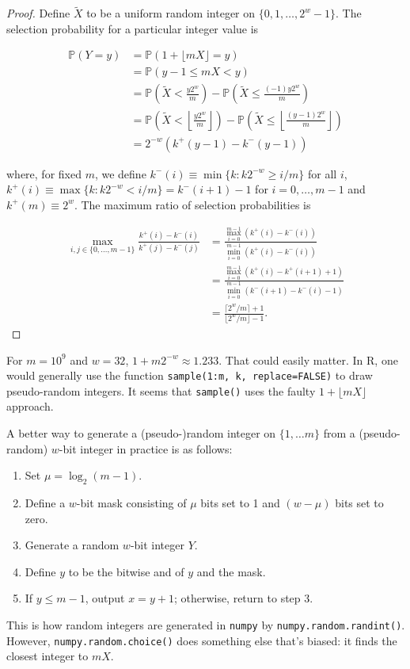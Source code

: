 \documentclass[12pt]{article}
\newcommand{\todo}[1]{{\color{red}{TO DO: \sc #1}}}
\newcommand{\pr}{\mathbb{P}} %
\begin{document}
\begin{proof}
Define $\tilde{X}$ to be a uniform random integer on $\{0, 1, \dots, 2^w - 1\}$.
The selection probability for a particular integer value is 

\begin{align*}
\pr\left(Y = y\right) &= \pr\left(1 + \lfloor mX \rfloor = y\right) \\
&= \pr\left(y-1 \leq mX < y\right) \\
&= \pr\left(\tilde{X} < \frac{y2^w}{m}\right) - \pr\left(\tilde{X} \leq \frac{(-1)y2^w}{m}\right)\\
&= \pr\left(\tilde{X} < \left\lfloor\frac{y2^w}{m}\right\rfloor\right) - \pr\left(\tilde{X} \leq \left\lfloor\frac{(y-1)2^w}{m}\right\rfloor\right)\\
&= 2^{-w}\left(k^+(y-1)- k^-(y-1)\right)
\end{align*}

\noindent where, for fixed $m$, we define $k^-(i) \equiv \min \{k: k2^{-w} \geq i/m\}$ for all $i$,
$k^+(i) \equiv \max \{k : k2^{-w} < i/m \} = k^-(i+1)-1$ for $i = 0, \dots, m-1$
and $k^+(m) \equiv 2^w$.
The maximum ratio of selection probabilities is 

\begin{align*}
\max_{i, j \in \{0, \ldots, m-1\}} \frac{k^+(i) - k^-(i)}{k^+(j) - k^-(j)}
&= \frac{ \max_{i=0}^{m-1} (k^+(i) - k^-(i))}{\min_{i=0}^{m-1} (k^+(i) - k^-(i))} \\
&= \frac{ \max_{i=0}^{m-1} (k^+(i) - k^+(i+1) + 1)}{\min_{i=0}^{m-1} (k^-(i+1) - k^-(i) - 1)} \\
&= \frac{\lceil 2^w/m \rceil + 1}{\lfloor 2^w/m \rfloor -1}.
\end{align*}
\end{proof}
\todo{is this proof right? seems wrong}

For $m = 10^9$ and $w=32$, $1 + m 2^{-w} \approx 1.233$. That could easily matter.
In R, one would generally use the function \texttt{sample(1:m, k, replace=FALSE)} to draw pseudo-random integers. 
It seems that \texttt{sample()} uses the faulty $1 + \lfloor mX\rfloor$ approach.
\todo{illustrate with a figure}

A better way to generate a (pseudo-)random integer on $\{1, \ldots m\}$ from a (pseudo-random) $w$-bit integer in practice is as follows:
\begin{enumerate}
\item Set $\mu = \log_2(m-1)$.
\item Define a $w$-bit mask consisting of $\mu$ bits set to 1 and $(w-\mu)$ bits set to zero.
\item Generate a random $w$-bit integer $Y$.
\item Define $y$ to be the bitwise and of $y$ and the mask.
\item If $y \le m-1$, output $x = y+1$; otherwise, return to step 3.
\end{enumerate}
This is how random integers are generated in \texttt{numpy} by \texttt{numpy.random.randint()}. 
However, \texttt{numpy.random.choice()} does something else that's biased: it finds the closest integer to $mX$.
\end{document}
